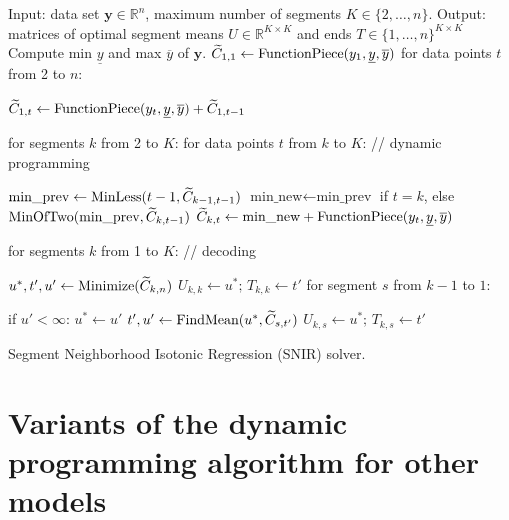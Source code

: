 \documentclass{article}
\newcommand{\RR}{\mathbb R}
\begin{document}
\begin{algorithm}[H]
\begin{algorithmic}[1]
\STATE Input: data set $\mathbf y\in\RR^n$, maximum number of segments $K\in\{2,\dots, n\}$.
\STATE Output: matrices of optimal segment means $U\in\RR^{K\times K}$ 
and ends $T\in\{1,\dots,n\}^{K\times K}$
\STATE Compute min $\underline y$ and max $\overline y$ of $\mathbf y$.
\STATE $\widetilde{C}_{1,1}\gets \text{FunctionPiece}(y_1, \underline y, \overline y)$
\STATE for data points $t$ from 2 to $n$:
\begin{ALC@g}
  \STATE $\widetilde{C}_{1,t}\gets \text{FunctionPiece}(y_t, \underline y, \overline y) + \widetilde{C}_{1,t-1}$
\end{ALC@g}
\STATE for segments $k$ from 2 to $K$: for data points $t$ from $k$ to $K$: // dynamic programming
\begin{ALC@g}
  \STATE $\text{min\_prev}\gets \text{MinLess}(t-1, \widetilde{C}_{k-1,t-1})$
    \STATE $\text{min\_new}\gets\text{min\_prev}$ if $t=k$, 
else $\text{MinOfTwo}(\text{min\_prev}, \widetilde{C}_{k, t-1})$
  \STATE $\widetilde{C}_{k,t}\gets \text{min\_new} + \text{FunctionPiece}(y_t, \underline y, \overline y)$
\end{ALC@g}
\STATE for segments $k$ from 1 to $K$: // decoding
\begin{ALC@g}
  \STATE $u^*,t',u'\gets \text{Minimize}(\widetilde{C}_{k,n})$
  \STATE $U_{k,k}\gets u^*;\, T_{k,k}\gets t'$
  \STATE for segment $s$ from $k-1$ to $1$:
  \begin{ALC@g}
    \STATE if $u' < \infty$: $u^*\gets u'$
    \STATE $t',u'\gets\text{FindMean}(u^*, \widetilde{C}_{s,t'})$
    \STATE $U_{k,s}\gets u^*;\, T_{k,s}\gets t'$
  \end{ALC@g}
\end{ALC@g}
\caption{\label{algo:SNIR}Segment Neighborhood Isotonic Regression (SNIR) solver.}
\end{algorithmic}
\end{algorithm}

\section{Variants of the dynamic programming algorithm for other models}
\end{document}
